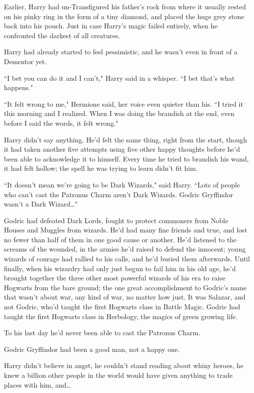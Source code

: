 Earlier, Harry had un-Transfigured his father's rock from where it usually rested on his pinky ring in the form of a tiny diamond, and placed the huge grey stone back into his pouch. Just in case Harry's magic failed entirely, when he confronted the darkest of all creatures.

Harry had already started to feel pessimistic, and he wasn't even in front of a Dementor yet.

``I bet you can do it and I can't," Harry said in a whisper. ``I bet that's what happens."

``It felt wrong to me," Hermione said, her voice even quieter than his. ``I tried it this morning and I realized. When I was doing the brandish at the end, even before I said the words, it felt wrong."

Harry didn't say anything. He'd felt the same thing, right from the start, though it had taken another five attempts using five other happy thoughts before he'd been able to acknowledge it to himself. Every time he tried to brandish his wand, it had felt hollow; the spell he was trying to learn didn't fit him.

``It doesn't mean we're going to be Dark Wizards," said Harry. ``Lots of people who can't cast the Patronus Charm aren't Dark Wizards. Godric Gryffindor wasn't a Dark Wizard{\ldots}"

Godric had defeated Dark Lords, fought to protect commoners from Noble Houses and Muggles from wizards. He'd had many fine friends and true, and lost no fewer than half of them in one good cause or another. He'd listened to the screams of the wounded, in the armies he'd raised to defend the innocent; young wizards of courage had rallied to his calls, and he'd buried them afterwards. Until finally, when his wizardry had only just begun to fail him in his old age, he'd brought together the three other most powerful wizards of his era to raise Hogwarts from the bare ground; the one great accomplishment to Godric's name that wasn't about war, any kind of war, no matter how just. It was Salazar, and not Godric, who'd taught the first Hogwarts class in Battle Magic. Godric had taught the first Hogwarts class in Herbology, the magics of green growing life.

To his last day he'd never been able to cast the Patronus Charm.

Godric Gryffindor had been a good man, not a happy one.

Harry didn't believe in angst, he couldn't stand reading about whiny heroes, he knew a billion other people in the world would have given anything to trade places with him, and{\ldots}

